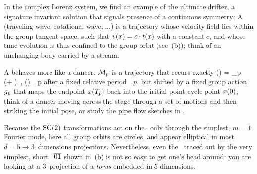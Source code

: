 \documentclass[aip,cha,reprint,
secnumarabic,
nofootinbib, tightenlines,
nobibnotes, showkeys, showpacs,
groupedaddress
]{revtex4-1}
\begin{document}
In the complex Lorenz system, we find an example of the ultimate drifter, 
a signature invariant solution that signals presence of a continuous symmetry; A {\em \reqv} (traveling wave,
rotational wave, ...) is a trajectory whose velocity field lies within
the group tangent space, such that
\(
v(x) = c \cdot t(x)
\) %
with a constant {\phaseVel} $c$, and whose time evolution is thus
confined to the group orbit (see \,(b)); think of an unchanging body carried by a
stream.

A {\em \rpo} behaves more like a dancer. ${\cal M}_p$ is a trajectory that
recurs exactly 
\beq
\ssp(\zeit) = \LieEl_p \, \ssp(\zeit +  )
    \,,\qquad
\ssp(\zeit) \in \pS_p
after a fixed {relative period} $\period{p}$, but shifted by a fixed
group action ${g_p}$ that maps the endpoint $x ({T_{p}}) $ back
into the initial point cycle point $x (0) $; think of a dancer moving
across the stage through a set of motions and then striking the initial
pose, or study the pipe flow sketches in .

Because the $\textrm{SO}(2)$ transformations act on the \cLf\ only through the
simplest, $m=1$ Fourier mode, here all group orbits are circles, and appear
elliptical in most $d=5 \to 3$~dimensions projections. Nevertheless, even
the \wurst\ traced out by the very simplest, short \rpo\ $\overline{01}$ shown
in \,(b) is not so easy to get one's head around:
you are looking at a 3\dmn\ projection of a \emph{torus} embedded in 5
dimensions.
\end{document}
